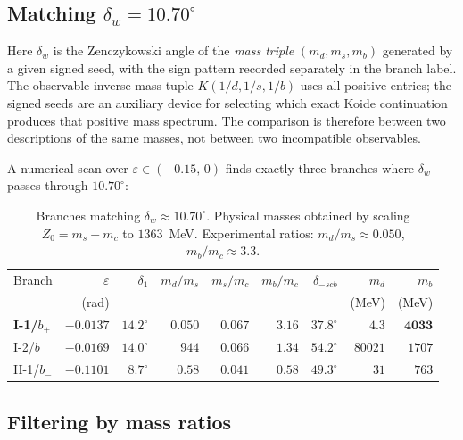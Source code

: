\documentclass[11pt]{article}
\begin{document}
\subsection{Matching $\delta_w = 10.70^\circ$}

Here $\delta_w$ is the Zenczykowski angle of the \emph{mass triple}
$(m_d,m_s,m_b)$ generated by a given signed seed, with the sign pattern
recorded separately in the branch label.  The observable inverse-mass tuple
$K(1/d,1/s,1/b)$ uses all positive entries; the signed seeds are an auxiliary
device for selecting which exact Koide continuation produces that positive
mass spectrum.  The comparison is therefore between two descriptions of the
same masses, not between two incompatible observables.

A numerical scan over $\varepsilon \in (-0.15,\,0)$ finds exactly
three branches where $\delta_w$ passes through $10.70^\circ$:

\begin{table}[h]
\centering
\small
\begin{tabular}{@{}l r r r r r r r r@{}}
\toprule
Branch & $\varepsilon$ & $\delta_1$ & $m_d/m_s$ & $m_s/m_c$ & $m_b/m_c$
  & $\delta_{-scb}$ & $m_d$ & $m_b$ \\
  & (rad) & & & & & & (MeV) & (MeV) \\
\midrule
\textbf{I-1/$b_+$} & $\mathbf{-0.0137}$ & $\mathbf{14.2^\circ}$ & $\mathbf{0.050}$ & $\mathbf{0.067}$ & $\mathbf{3.16}$
  & $\mathbf{37.8^\circ}$ & $\mathbf{4.3}$ & $\mathbf{4033}$ \\
I-2/$b_-$ & $-0.0169$ & $14.0^\circ$ & $944$ & $0.066$ & $1.34$
  & $54.2^\circ$ & $80021$ & $1707$ \\
II-1/$b_-$ & $-0.1101$ & $8.7^\circ$ & $0.58$ & $0.041$ & $0.58$
  & $49.3^\circ$ & $31$ & $763$ \\
\bottomrule
\end{tabular}
\caption{Branches matching $\delta_w\approx 10.70^\circ$.
  Physical masses obtained by scaling $Z_0 = m_s + m_c$ to $1363$~MeV.
  Experimental ratios: $m_d/m_s\approx 0.050$, $m_b/m_c\approx 3.3$.}
\label{tab:branch-match}
\end{table}

\subsection{Filtering by mass ratios}
\end{document}
